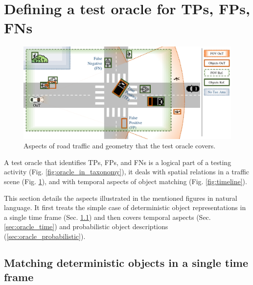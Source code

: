 \documentclass[conference]{IEEEtran}
\begin{document}



\section{Defining a test oracle for TPs, FPs, FNs}
\label{sec:criteria}



\begin{figure}[t]
	\centering
	\vspace*{2mm}
	\includegraphics[width=\textwidth]{img/top_down_fitting_slide.pdf}
	
	\caption{Aspects of road traffic and geometry that the test oracle covers.
	}
	\label{fig:top_down_all}
\end{figure}


A test oracle that identifies TPs, FPs, and FNs is a logical part of a testing activity (Fig. \ref{fig:oracle_in_taxonomy}), it deals with spatial relations in a traffic scene (Fig. \ref{fig:top_down_all}), and with temporal aspects of object matching (Fig. \ref{fig:timeline}).

This section details the aspects illustrated in the mentioned figures in natural language. 
It first treats the simple case of deterministic object representations in a single time frame (Sec. \ref{sec:oracle_simple}) and then covers temporal aspects (Sec. \ref{sec:oracle_time}) and probabilistic object descriptions (\ref{sec:oracle_probabilistic}).


\subsection{Matching deterministic objects in a single time frame}
\label{sec:oracle_simple}
\end{document}
